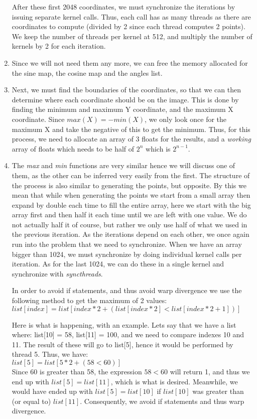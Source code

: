 \begin{enumerate}
	After these first 2048 coordinates, we must synchronize the iterations by issuing separate kernel calls. Thus, each call has as many threads as there are coordinates to compute (divided by 2 since each thread computes 2 points). We keep the number of threads per kernel at 512, and multiply the number of kernels by 2 for each iteration.
	
	\item Since we will not need them any more, we can free the memory allocated for the sine map, the cosine map and the angles list.
	
	
	
	\item Next, we must find the boundaries of the coordinates, so that we can then determine where each coordinate should be on the image. This is done by finding the minimum and maximum Y coordinate, and the maximum X coordinate. Since $max(X)=-min(X)$, we only look once for the maximum X and take the negative of this to get the minimum. Thus, for this process, we need to allocate an array of 3 floats for the results, and a \textit{working} array of floats which needs to be half of $2^n$ which is $2^{n-1}$.
	
	\item The \textit{max} and \textit{min} functions are very similar hence we will discuss one of them, as the other can be inferred very easily from the first. The structure of the process is also similar to generating the points, but opposite. By this we mean that while when generating the points we start from a small array then expand by double each time to fill the entire array, here we start with the big array first and then half it each time until we are left with one value. We do not actually half it of course, but rather we only use half of what we used in the previous iteration. As the iterations depend on each other, we once again run into the problem that we need to synchronize. When we have an array bigger than 1024, we must synchronize by doing individual kernel calls per iteration. As for the last 1024, we can do these in a single kernel and synchronize with \textit{syncthreads}.
	
	In order to avoid if statements, and thus avoid warp divergence we use the following method to get the maximum of 2 values:\\
	$list[index] = list[ index*2 + (list[index*2] < list[index*2 + 1]) ]$
	
	Here is what is happening, with an example. Lets say that we have a list where: list[10] = 58, list[11] = 100, and we need to compare indexes 10 and 11. The result of these will go to list[5], hence it would be performed by thread 5. Thus, we have:\\
	$list[5] = list[5*2+(58<60)]$\\
	Since 60 is greater than 58, the expression $58<60$ will return 1, and thus we end up with $list[5] = list[11]$, which is what is desired. Meanwhile, we would have ended up with $list[5] = list[10]$ if $list[10]$ was greater than (or equal to) $list[11]$. Consequently, we avoid if statements and thus warp divergence.
	

\end{enumerate}
